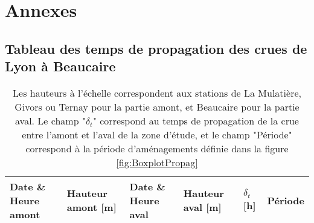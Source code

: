 \appendix
\chapter{Annexes}
\label{chap:annexes}

	\section{Tableau des temps de propagation des crues de Lyon à Beaucaire}
	\label{sec:TabPropag}


\begin{longtable}{|p{3cm}|p{2.1cm}|p{3cm}|p{2cm}|l|l|}
	\caption{Les hauteurs à l'échelle correspondent aux stations de La Mulatière, Givors ou Ternay pour la partie amont, et Beaucaire pour la partie aval. Le champ "$\delta_t$" correspond au temps de propagation de la crue entre l'amont et l'aval de la zone d'étude, et le champ "Période" correspond à la période d'aménagements définie dans la figure \ref{fig:BoxplotPropag}}
	\label{tab:Propag}\\

        \hline
        \textbf{Date \& Heure amont} & \textbf{Hauteur amont [m]} & \textbf{Date \& Heure aval} & \textbf{Hauteur aval [m]} & \textbf{$\delta_t$[h]} & \textbf{Période} \\ \hline
        

\end{longtable}
